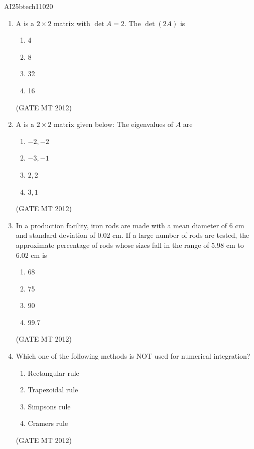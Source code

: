 \documentclass[journal, 11pt, onecolumn]{IEEEtran}
\theoremstyle{remark}
\begin{document}
\begin{center}
    \Large{AI25btech11020}
\end{center} 


\begin{enumerate}

\item A is a $2 \times 2$ matrix with $\det A = 2$. The $\det (2A)$ is
\begin{multicols}{4}
\begin{enumerate}  
\item 4
\item 8
\item 32
\item 16
\end{enumerate}
\end{multicols}
\hfill(GATE MT 2012)



\item A is a $2 \times 2$ matrix given below:
The eigenvalues of $A$ are 
\begin{multicols}{4}
\begin{enumerate}  
\item $-2, -2$
\item $-3, -1$
\item $2, 2$
\item $3, 1$
\end{enumerate}
\end{multicols}
\hfill(GATE MT 2012)


\item In a production facility, iron rods are made with a mean diameter of 6 cm and standard deviation of 0.02 cm. If a large number of rods are tested, the approximate percentage of rods whose sizes fall in the range of 5.98 cm to 6.02 cm is
\begin{multicols}{4}
\begin{enumerate}  
\item 68
\item 75
\item 90
\item 99.7
\end{enumerate}
\end{multicols}
\hfill(GATE MT 2012)


\item Which one of the following methods is NOT used for numerical integration? 
\begin{multicols}{4}
\begin{enumerate}  
\item Rectangular rule
\item Trapezoidal rule
\item Simpson\textquotesingle s rule
\item Cramer\textquotesingle s rule
\end{enumerate}
\end{multicols}
\hfill(GATE MT 2012)
 


\end{enumerate}
\end{document}

